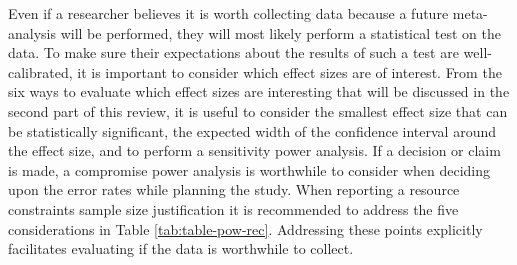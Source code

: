 \documentclass[
  english,
  ,jou, a4paper,floatsintext]{apa6}
\begin{document}
Even if a researcher believes it is worth collecting data because a future meta-analysis will be performed, they will most likely perform a statistical test on the data. To make sure their expectations about the results of such a test are well-calibrated, it is important to consider which effect sizes are of interest. From the six ways to evaluate which effect sizes are interesting that will be discussed in the second part of this review, it is useful to consider the smallest effect size that can be statistically significant, the expected width of the confidence interval around the effect size, and to perform a sensitivity power analysis. If a decision or claim is made, a compromise power analysis is worthwhile to consider when deciding upon the error rates while planning the study. When reporting a resource constraints sample size justification it is recommended to address the five considerations in Table \ref{tab:table-pow-rec}. Addressing these points explicitly facilitates evaluating if the data is worthwhile to collect.
\end{document}
